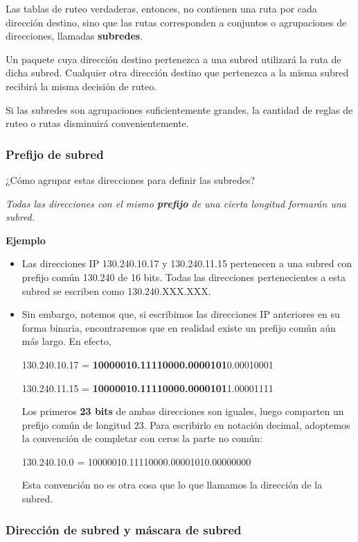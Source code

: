 \documentclass[spanish,A4,]{article}
\begin{document}
Las tablas de ruteo verdaderas, entonces, no contienen una ruta por cada
dirección destino, sino que las rutas corresponden a conjuntos o
agrupaciones de direcciones, llamadas \textbf{subredes}.

Un paquete cuya dirección destino pertenezca a una subred utilizará la
ruta de dicha subred. Cualquier otra dirección destino que pertenezca a
la misma subred recibirá la misma decisión de ruteo.

Si las subredes son agrupaciones suficientemente grandes, la cantidad de
reglas de ruteo o rutas disminuirá convenientemente.

\subsubsection{Prefijo de subred}\label{prefijo-de-subred}

¿Cómo agrupar estas direcciones para definir las subredes?

\emph{Todas las direcciones con el mismo \textbf{prefijo} de una cierta
longitud formarán una subred.}

\textbf{Ejemplo}

\begin{itemize}
\item
  Las direcciones IP 130.240.10.17 y 130.240.11.15 pertenecen a una
  subred con prefijo común 130.240 de 16 bits. Todas las direcciones
  pertenecientes a esta subred se escriben como 130.240.XXX.XXX.
\item
  Sin embargo, notemos que, si escribimos las direcciones IP anteriores
  en su forma binaria, encontraremos que en realidad existe un prefijo
  común aún más largo. En efecto,

  130.240.10.17 = \textbf{10000010.11110000.0000101}0.00010001

  130.240.11.15 = \textbf{10000010.11110000.0000101}1.00001111

  Los primeros \textbf{23 bits} de ambas direcciones son iguales, luego
  comparten un prefijo común de longitud 23. Para escribirlo en notación
  decimal, adoptemos la convención de completar con ceros la parte no
  común:

  130.240.10.0 = 10000010.11110000.00001010.00000000

  Esta convención no es otra cosa que lo que llamamos la dirección de la
  subred.
\end{itemize}

\subsubsection{Dirección de subred y máscara de
subred}\label{direcciuxf3n-de-subred-y-muxe1scara-de-subred}
\end{document}
